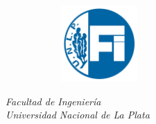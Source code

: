 \begin{titlepage}
\begin{center}
\begin{figure}[H]
                \begin{subfigure}
                    \centering
                    \includegraphics[width=0.32\textwidth]{Imagenes/FI.jpg}
                \end{subfigure}
            \end{figure}
            \vspace{1cm}
            \textit{
            Facultad de Ingeniería
            \\
            Universidad Nacional de La Plata}
            \vspace{1cm}
        \end{center}
    \end{titlepage}